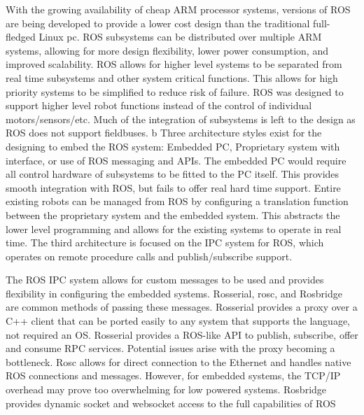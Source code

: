 With the growing availability of cheap ARM processor systems, versions of ROS are being developed to provide a lower cost design than the traditional full-fledged Linux pc. ROS subsystems can be distributed over multiple ARM systems, allowing for more design flexibility, lower power consumption, and improved scalability. ROS allows for higher level systems to be separated from real time subsystems and other system critical functions. This allows for high priority systems to be simplified to reduce risk of failure. ROS was designed to support higher level robot functions instead of the control of individual motors/sensors/etc. Much of the integration of subsystems is left to the design as ROS does not support fieldbuses. 
b
Three architecture styles exist for the designing to embed the ROS system: Embedded PC, Proprietary system with interface, or use of ROS messaging and APIs. The embedded PC would require all control hardware of subsystems to be fitted to the PC itself. This provides smooth integration with ROS, but fails to offer real hard time support. Entire existing robots can be managed from ROS by configuring a translation function between the proprietary system and the embedded system. This abstracts the lower level programming and allows for the existing systems to operate in real time. The third architecture is focused on the IPC system for ROS, which operates on remote procedure calls and publish/subscribe support. 

The ROS IPC system allows for custom messages to be used and provides flexibility in configuring the embedded systems. Rosserial, rosc, and Rosbridge are common methods of passing these messages. Rosserial provides a proxy over a C++ client that can be ported easily to any system that supports the language, not required an OS. Rosserial provides a ROS-like API to publish, subscribe, offer and consume RPC services. Potential issues arise with the proxy becoming a bottleneck. Rosc allows for direct connection to the Ethernet and handles native ROS connections and messages. However, for embedded systems, the TCP/IP overhead may prove too overwhelming for low powered systems. Rosbridge provides dynamic socket and websocket access to the full capabilities of ROS

